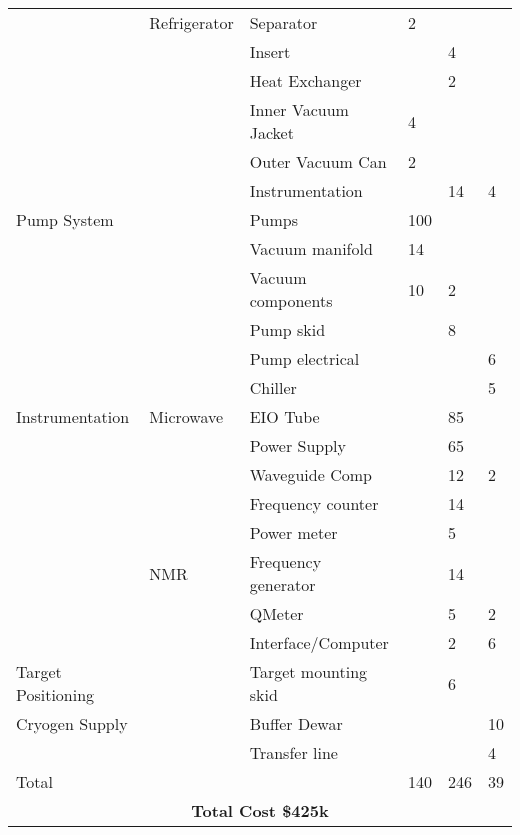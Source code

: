 \begin{table}[h]
\begin{center}
\begin{tabular}{|l|l|l|l|l|l|}
         & Refrigerator& Separator            &   2  &           &      \\ \cline{3-6} 
         &          & Insert               &      & 4         &       \\ \cline{3-6} 
         &          & Heat Exchanger       &      & 2         &       \\ \cline{3-6} 
         &          & Inner Vacuum Jacket  &  4   &           &       \\ \cline{3-6} 
         &          & Outer Vacuum Can     &  2   &           &       \\ \cline{3-6}
         &          & Instrumentation      &      & 14        & 4      \\ \hline
Pump System  &      &  Pumps               & 100  &           &       \\ \cline{3-6}
             &      &  Vacuum manifold     &  14  &           &       \\ \cline{3-6}
             &      &  Vacuum components   &  10  & 2         &       \\ \cline{3-6}
             &      &  Pump skid           &      & 8         &       \\ \cline{3-6}
             &      &  Pump electrical     &      &           & 6      \\\cline{3-6}
             &      &  Chiller             &      &           & 5      \\ \hline
Instrumentation & Microwave& EIO Tube         &      &  85       &       \\\cline{3-6}
                &          & Power Supply     &      &  65       &       \\\cline{3-6}
                &          & Waveguide Comp   &      &  12       & 2      \\\cline{3-6}
                &          & Frequency counter&      &  14       &       \\\cline{3-6}
                &          & Power meter      &      &  5        &       \\\cline{2-6}
                & NMR      & Frequency generator&    &  14       &       \\\cline{3-6}
                &          & QMeter           &      &  5        & 2      \\\cline{3-6}
                &          & Interface/Computer &     & 2        & 6     \\ \hline

Target Positioning &       & Target mounting skid&    &  6        &        \\ \hline
Cryogen Supply     &       & Buffer Dewar        &    &          & 10       \\ \cline{3-6}
                   &       & Transfer line       &    &          &  4      \\ \hline
Total              &       &                     &140 & 246      &  39      \\ \hline
\multicolumn{6}{|c|}{\bf Total Cost \$425k}\\ \hline     
\end{tabular}
\end{center}
\end{table}

